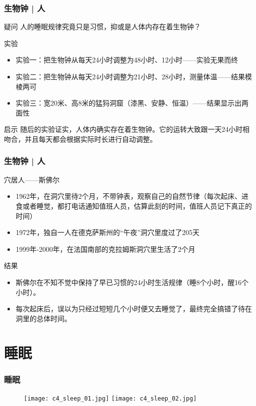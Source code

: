\begin{frame}
  \frametitle{生物钟 | 人}
  \begin{block}{疑问}
    人的睡眠规律究竟只是习惯，抑或是人体内存在着生物钟？
  \end{block}
  \pause
  \begin{block}{实验}
    \begin{itemize}
      \item 实验一：把生物钟从每天24小时调整为48小时、12小时——实验无果而终
      \item 实验二：把生物钟从每天24小时调整为21小时、28小时，测量体温——结果模棱两可
      \item 实验三：宽20米、高8米的猛犸洞窟（漆黑、安静、恒温）——结果显示出两面性
    \end{itemize}
  \end{block}
  \pause
  \begin{block}{启示}
随后的实验证实，\alert{人体内确实存在着生物钟}。它的运转大致跟一天24小时相吻合，并且每天都会根据实际时长进行自动调整。
  \end{block}
\end{frame}

\begin{frame}
  \frametitle{生物钟 | 人}
  \begin{block}{穴居人——斯佛尔}
    \begin{itemize}
      \item 1962年，在洞穴里待2个月，不带钟表，观察自己的自然节律（每次起床、进食或者睡觉，都打电话通知值班人员，估算此刻的时间，值班人员记下真正的时间）
      \item 1972年，独自一人在德克萨斯州的“午夜”洞穴里度过了205天
      \item 1999年-2000年，在法国南部的克拉姆斯洞穴里生活了2个月
    \end{itemize}
  \end{block}
  \pause
  \begin{block}{结果}
    \begin{itemize}
      \item 斯佛尔在不知不觉中保持了早已习惯的24小时生活规律（睡8个小时，醒16个小时）。
      \item 每次起床后，误以为只经过短短几个小时便又去睡觉了，最终完全搞错了待在洞里的总体时间。
    \end{itemize}
  \end{block}
\end{frame}

\section{睡眠}
\begin{frame}
  \frametitle{睡眠}
  \begin{figure}
    \centering
    \texttt{[image: c4\_sleep\_01.jpg]}
    \texttt{[image: c4\_sleep\_02.jpg]}
  \end{figure}
\end{frame}

